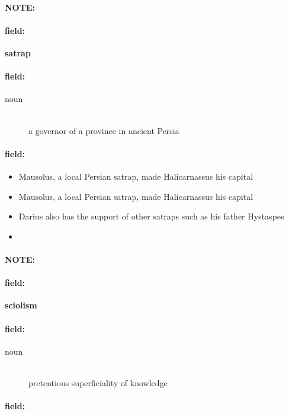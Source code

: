 \documentclass[12pt]{article}
\newenvironment{note}{\paragraph{NOTE:}}{}
\newenvironment{field}{\paragraph{field:}}{}
\begin{document}
\begin{note}
\begin{field}
\textbf{\large satrap}
\end{field}


\begin{field}
\begin{description}
\item[noun] \hfill \\ 
a governor of a province in ancient Persia

\end{description}
\end{field}

\begin{field}
\begin{itemize}
\item Mausolus, a local Persian satrap, made Halicarnassus his capital
\item Mausolus, a local Persian satrap, made Halicarnassus his capital
\item Darius also has the support of other satraps such as his father Hystaspes
\item 
\end{itemize}
\end{field}
\end{note}
\begin{note}
\begin{field}
\textbf{\large sciolism}
\end{field}


\begin{field}
\begin{description}
\item[noun] \hfill \\ 
pretentious superficiality of knowledge

\end{description}
\end{field}

\begin{field}
\end{field}
\end{note}
\end{document}
